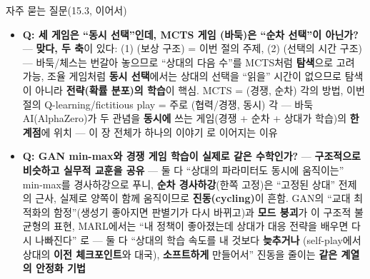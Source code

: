 \documentclass[aspectratio=169,11pt]{beamer}
\begin{document}
\begin{frame}{자주 묻는 질문(15.3, 이어서)}
  \small
  \begin{itemize}
    \item \textbf{Q: 세 게임은 ``동시 선택''인데, MCTS 게임
      (바둑)은 ``순차 선택''이 아닌가?} --- \textbf{맞다,
      두 축}이 있다: (1) (보상 구조) = 이번
      절의 주제, (2) (선택의 시간 구조) ---
      바둑/체스는 번갈아 놓으므로 ``상대의 다음 수''를
      MCTS처럼 \textbf{탐색}으로 고려 가능, 조율 게임처럼
      \textbf{동시 선택}에서는 상대의 선택을 ``읽을''
      시간이 없으므로 탐색이 아니라 \textbf{전략(확률
      분포)의 학습}이 핵심. MCTS = (경쟁, 순차) 각의 방법,
      이번 절의 Q-learning/fictitious play = 주로 (협력/경쟁,
      동시) 각 --- 바둑 AI(AlphaZero)가 두 관념을
      \textbf{동시에} 쓰는 게임(경쟁 + 순차 + 상대가 학습)의
      \textbf{한계점}에 위치 --- 이 장 전체가 하나의 이야기
     로 이어지는 이유
    \item \textbf{Q: GAN min-max와 경쟁 게임 학습이 실제로
      같은 수학인가?} --- \textbf{구조적으로 비슷하고 실무적
      교훈을 공유} --- 둘 다 ``상대의 파라미터도 동시에
      움직이는'' min-max를 경사하강으로 푸니, \textbf{순차
      경사하강}(한쪽 고정)은 ``고정된 상대'' 전제의 근사,
      실제로 양쪽이 함께 움직이므로 \textbf{진동(cycling)}이
      흔함. GAN의 ``교대 최적화의 함정''(생성기 좋아지면
      판별기가 다시 바뀌고)과 \textbf{모드 붕괴}가 이
      구조적 불균형의 표현, MARL에서는 ``내 정책이
      좋아졌는데 상대가 대응 전략을 배우면 다시 나빠진다''
     로 --- 둘 다 ``상대의 학습 속도를 내 것보다 \textbf{늦추거나
      }(self-play에서 상대의 \textbf{이전 체크포인트}와
      대국), \textbf{소프트하게} 만들어서'' 진동을 줄이는
      \textbf{같은 계열의 안정화 기법}
  \end{itemize}
\end{frame}
\end{document}
